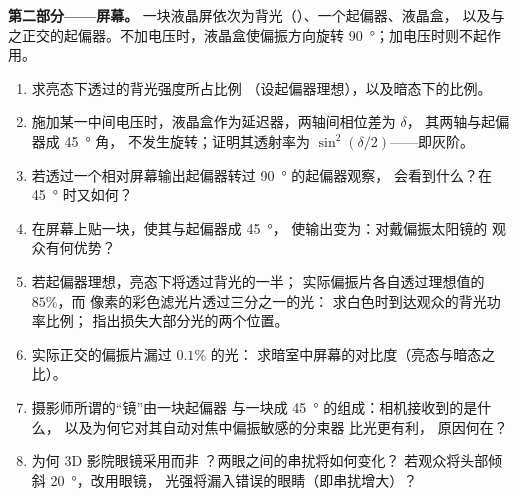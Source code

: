 \begin{problem}
\medskip
\noindent\textbf{第二部分——屏幕。}
一块液晶屏依次为背光（）、一个起偏器、液晶盒，
以及与之正交的起偏器。不加电压时，液晶盒使偏振方向旋转
\qty{90}{\degree}；加电压时则不起作用。
\begin{enumerate}[resume]
  \item 求亮态下透过的背光强度所占比例
        （设起偏器理想），以及暗态下的比例。
  \item 施加某一中间电压时，液晶盒作为延迟器，两轴间相位差为 $\delta$，
        其两轴与起偏器成 \qty{45}{\degree} 角，
        不发生旋转；证明其透射率为
        $\sin^2(\delta/2)$——即灰阶。
  \item 若透过一个相对屏幕输出起偏器转过 \qty{90}{\degree} 的起偏器观察，
        会看到什么？在 \qty{45}{\degree} 时又如何？
  \item 在屏幕上贴一块，使其与起偏器成 \qty{45}{\degree}，
        使输出变为：对戴偏振太阳镜的
        观众有何优势？
  \item 若起偏器理想，亮态下将透过背光的一半；
        实际偏振片各自透过理想值的 $85\%$，而
        像素的彩色滤光片透过三分之一的光：
        求白色时到达观众的背光功率比例；
        指出损失大部分光的两个位置。
  \item 实际正交的偏振片漏过 $0.1\%$ 的光：
        求暗室中屏幕的对比度（亮态与暗态之比）。
  \item 摄影师所谓的“镜”由一块起偏器
        与一块成 \qty{45}{\degree} 的组成：相机接收到的是什么，
        以及为何它对其自动对焦中偏振敏感的分束器
        比光更有利，
        原因何在？
  \item 为何 3D 影院眼镜采用而非
        ？两眼之间的串扰将如何变化？
        若观众将头部倾斜 \qty{20}{\degree}，改用眼镜，
        光强将漏入错误的眼睛（即串扰增大）？
\end{enumerate}


\end{problem}
